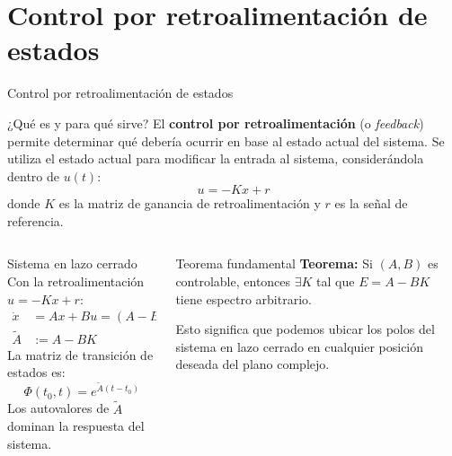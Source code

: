 \documentclass[
    10pt,
    aspectratio=169,
    xcolor={dvipsnames},
    spanish,
    ]{beamer}
\begin{document}
\section{Control por retroalimentación de estados}
\begin{frame}{Control por retroalimentación de estados}
\footnotesize
\begin{block}{¿Qué es y para qué sirve?}
  El \textbf{control por retroalimentación} (o \emph{feedback}) permite determinar qué debería ocurrir en base al estado actual del sistema. Se utiliza el estado actual para modificar la entrada al sistema, considerándola dentro de $u(t)$:
  \[ u = -Kx + r \]
  donde $K$ es la matriz de ganancia de retroalimentación y $r$ es la señal de referencia.
\end{block}

\begin{columns}
  \begin{column}{0.52\textwidth}
    \begin{block}{Sistema en lazo cerrado}
      Con la retroalimentación $u = -Kx + r$:
      \begin{align}
        \dot{x} &= Ax + Bu = (A - BK)x + Br \\
        \tilde{A} &:= A - BK
      \end{align}
      La matriz de transición de estados es:
      \[ \Phi(t_0, t) = e^{\tilde{A}(t-t_0)} \]
      Los autovalores de $\tilde{A}$ dominan la respuesta del sistema.
    \end{block}
  \end{column}
  \begin{column}{0.46\textwidth}
    \begin{block}{Teorema fundamental}
      \textbf{Teorema:} Si $(A,B)$ es controlable, entonces $\exists K$ tal que $E = A - BK$ tiene espectro arbitrario.
      
      Esto significa que podemos ubicar los polos del sistema en lazo cerrado en cualquier posición deseada del plano complejo.
    \end{block}
  \end{column}
\end{columns}
\end{frame}
\end{document}
